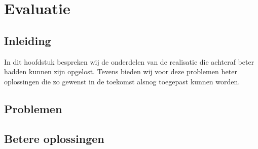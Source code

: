 \chapter{Evaluatie}
\section{Inleiding}
In dit hoofdstuk bespreken wij de onderdelen van de realisatie die achteraf beter hadden kunnen zijn opgelost.
Tevens bieden wij voor deze problemen beter oplossingen die zo gewenst in de toekomst alsnog toegepast kunnen worden.
\newpage

\section{Problemen}

\section{Betere oplossingen}